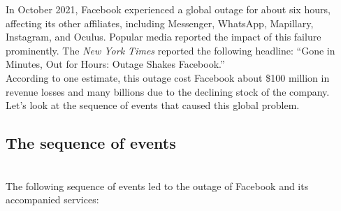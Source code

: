 

In October 2021, Facebook experienced a global outage for about six hours, affecting its other affiliates, including Messenger, WhatsApp, Mapillary, Instagram, and Oculus. Popular media reported the impact of this failure prominently. The
\emph{New York Times} reported the following headline: ``Gone in Minutes, Out for Hours: Outage Shakes Facebook.''
\\
According to one estimate, this outage cost Facebook about \$100 million in revenue losses and many billions due to the declining stock of the company.
\\
Let's look at the sequence of events that caused this global problem.

\subsection{The sequence of events}\label{WIIpVREk_OUtjlk2fMLAl}
\\
The following sequence of events led to the outage of Facebook and its accompanied services:

